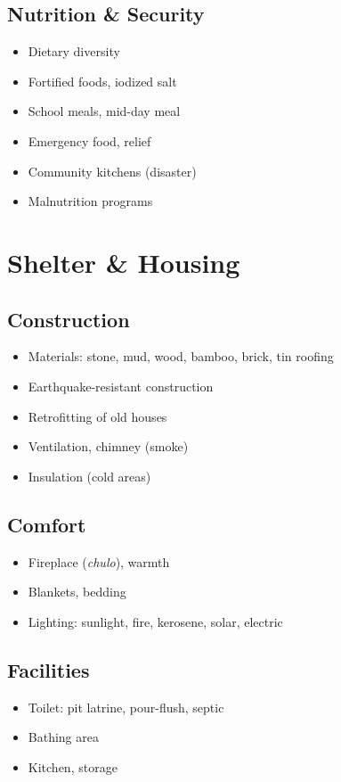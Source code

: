 \documentclass[11pt,a4paper]{article}
\begin{document}
\subsection{Nutrition \& Security}
\begin{itemize}
    \item Dietary diversity
    \item Fortified foods, iodized salt
    \item School meals, mid-day meal
    \item Emergency food, relief
    \item Community kitchens (disaster)
    \item Malnutrition programs
\end{itemize}

\section{Shelter \& Housing}

\subsection{Construction}
\begin{itemize}
    \item Materials: stone, mud, wood, bamboo, brick, tin roofing
    \item Earthquake-resistant construction
    \item Retrofitting of old houses
    \item Ventilation, chimney (smoke)
    \item Insulation (cold areas)
\end{itemize}

\subsection{Comfort}
\begin{itemize}
    \item Fireplace (\textit{chulo}), warmth
    \item Blankets, bedding
    \item Lighting: sunlight, fire, kerosene, solar, electric
\end{itemize}

\subsection{Facilities}
\begin{itemize}
    \item Toilet: pit latrine, pour-flush, septic
    \item Bathing area
    \item Kitchen, storage
\end{itemize}
\end{document}
